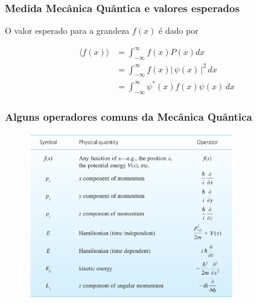 \documentclass[12pt,brazil,table]{beamer}
\begin{document}
\begin{frame}
  \frametitle{Medida Mecânica Quântica e valores esperados}
  \fontsize{11pt}{11pt}\selectfont

  O valor esperado para a grandeza $f(x)$ é dado por
  
  \[
    \begin{align*}
      \langle f(x) \rangle &= \int_{-\infty}^\infty f(x) P(x) dx\\
      &=\int_{-\infty}^\infty f(x)|\, \psi (x) \, |^2 \, dx\\
      &=\int_{-\infty}^\infty \psi^*(x) f(x) \psi (x) \, dx
    \end{align*}
  \]

  
\end{frame}

\begin{frame}
  \frametitle{Alguns operadores comuns da Mecânica Quântica}

  
  \begin{figure}
    \includegraphics[width=9cm]{figuras/fig17}
  \end{figure}
\end{frame}

\end{document}
